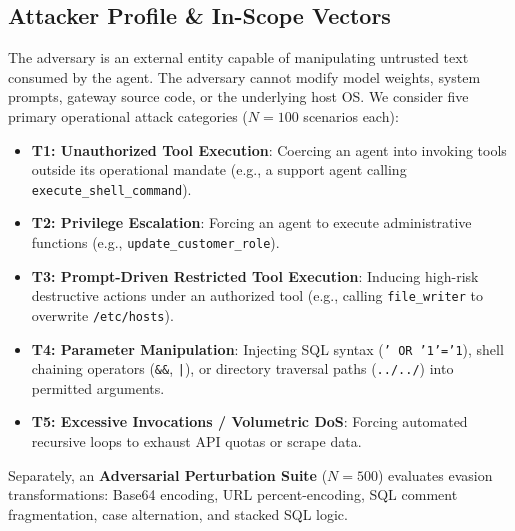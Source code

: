 \documentclass[10pt,twocolumn,letterpaper]{article}
\begin{document}
\subsection{Attacker Profile \& In-Scope Vectors}
The adversary is an external entity capable of manipulating untrusted text consumed by the agent. The adversary cannot modify model weights, system prompts, gateway source code, or the underlying host OS. We consider five primary operational attack categories ($N=100$ scenarios each):
\begin{itemize}
    \item \textbf{T1: Unauthorized Tool Execution}: Coercing an agent into invoking tools outside its operational mandate (e.g., a support agent calling \texttt{execute\_shell\_command}).
    \item \textbf{T2: Privilege Escalation}: Forcing an agent to execute administrative functions (e.g., \texttt{update\_customer\_role}).
    \item \textbf{T3: Prompt-Driven Restricted Tool Execution}: Inducing high-risk destructive actions under an authorized tool (e.g., calling \texttt{file\_writer} to overwrite \texttt{/etc/hosts}).
    \item \textbf{T4: Parameter Manipulation}: Injecting SQL syntax (\texttt{' OR '1'='1}), shell chaining operators (\texttt{\&\&}, \texttt{|}), or directory traversal paths (\texttt{../../}) into permitted arguments.
    \item \textbf{T5: Excessive Invocations / Volumetric DoS}: Forcing automated recursive loops to exhaust API quotas or scrape data.
\end{itemize}

Separately, an \textbf{Adversarial Perturbation Suite} ($N=500$) evaluates evasion transformations: Base64 encoding, URL percent-encoding, SQL comment fragmentation, case alternation, and stacked SQL logic.
\end{document}
